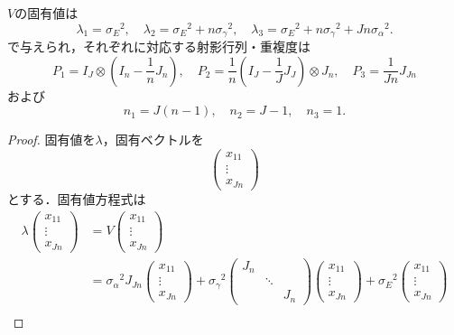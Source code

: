 \begin{screen}
  \(V\)の固有値は
  \[
  \lambda_1 = \sigma_E{}^2 , \quad
  \lambda_2 = \sigma_E{}^2 + n\sigma_\gamma{}^2 , \quad
  \lambda_3 = \sigma_E{}^2 + n\sigma_\gamma{}^2 + Jn \sigma_\alpha{}^2 .
  \]
  で与えられ，それぞれに対応する射影行列・重複度は
  \[
    P_1 = I_J \otimes \left( I_n - \frac{1}{n} J_n \right) , \quad
    P_2 = \frac{1}{n} \left( I_J - \frac{1}{J} J_J \right) \otimes J_n , \quad
    P_3 = \frac{1}{Jn} J_{Jn}
  \]
  および
  \[ n_1 = J(n-1) , \quad n_2 = J-1, \quad n_3 = 1 . \]
\end{screen}
\begin{proof}
  固有値を\(\lambda\)，固有ベクトルを
  \[
  \begin{pmatrix}
    x_{11} \\ \vdots \\ x_{Jn}
  \end{pmatrix}
  \]
  とする．固有値方程式は
  \begin{align*}
    \lambda
    \begin{pmatrix}
      x_{11} \\ \vdots \\ x_{Jn}
    \end{pmatrix}
    &= V
    \begin{pmatrix}
      x_{11} \\ \vdots \\ x_{Jn}
    \end{pmatrix}
    \\
    &= \sigma_\alpha{}^2
    J_{Jn}
    \begin{pmatrix}
      x_{11} \\ \vdots \\ x_{Jn}
    \end{pmatrix}
    +
    \sigma_\gamma{}^2
    \begin{pmatrix}
      J_n & & \\
      & \ddots & \\
      & & J_n
    \end{pmatrix}
    \begin{pmatrix}
      x_{11} \\ \vdots \\ x_{Jn}
    \end{pmatrix}
    +
    \sigma_E{}^2
    \begin{pmatrix}
      x_{11} \\ \vdots \\ x_{Jn}
    \end{pmatrix}
    \\

\end{align*}
\end{proof}
